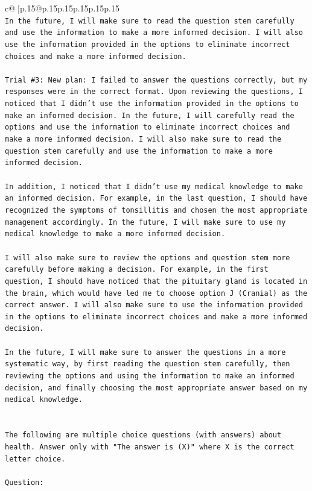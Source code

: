 \documentclass{article}
\begin{document}
{\begin{supertabular}{c@{$\;$}|p{.15\linewidth}@{}p{.15\linewidth}p{.15\linewidth}p{.15\linewidth}p{.15\linewidth}p{.15\linewidth}}
{{{\\ 
\texttt{In the future, I will make sure to read the question stem carefully and use the information to make a more informed decision. I will also use the information provided in the options to eliminate incorrect choices and make a more informed decision.} \\
\\ 
\texttt{Trial \#3: New plan: I failed to answer the questions correctly, but my responses were in the correct format. Upon reviewing the questions, I noticed that I didn't use the information provided in the options to make an informed decision. In the future, I will carefully read the options and use the information to eliminate incorrect choices and make a more informed decision. I will also make sure to read the question stem carefully and use the information to make a more informed decision. } \\
\\ 
\texttt{In addition, I noticed that I didn't use my medical knowledge to make an informed decision. For example, in the last question, I should have recognized the symptoms of tonsillitis and chosen the most appropriate management accordingly. In the future, I will make sure to use my medical knowledge to make a more informed decision. } \\
\\ 
\texttt{I will also make sure to review the options and question stem more carefully before making a decision. For example, in the first question, I should have noticed that the pituitary gland is located in the brain, which would have led me to choose option J (Cranial) as the correct answer. I will also make sure to use the information provided in the options to eliminate incorrect choices and make a more informed decision. } \\
\\ 
\texttt{In the future, I will make sure to answer the questions in a more systematic way, by first reading the question stem carefully, then reviewing the options and using the information to make an informed decision, and finally choosing the most appropriate answer based on my medical knowledge.} \\
\\ 
\\ 
\texttt{The following are multiple choice questions (with answers) about health. Answer only with "The answer is (X)" where X is the correct letter choice.} \\
\\ 
\texttt{Question:} \\
}}}
\end{supertabular}}
\end{document}
